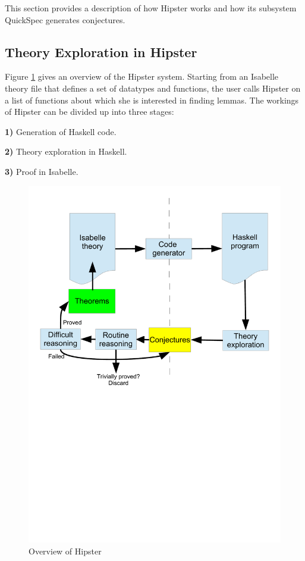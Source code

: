 \label{sec:background}
This section provides a description of how Hipster works and how its subsystem QuickSpec generates conjectures.

\subsection{Theory Exploration in Hipster}
Figure \ref{fig:hipster} gives an overview of the Hipster system.
%
Starting from an Isabelle theory file that defines a set of datatypes and functions, the user calls Hipster on a list of functions about which she is interested in finding lemmas.
%
The workings of Hipster can be divided up into three stages: 

\textbf{1)} Generation of Haskell code.

\textbf{2)} Theory exploration in Haskell. 

\textbf{3)} Proof in Isabelle.

%
\begin{figure}[htbp]
\begin{center}
\includegraphics[scale=0.4]{hipster}
\caption{Overview of Hipster}
\label{fig:hipster}
\end{center}
\end{figure}

